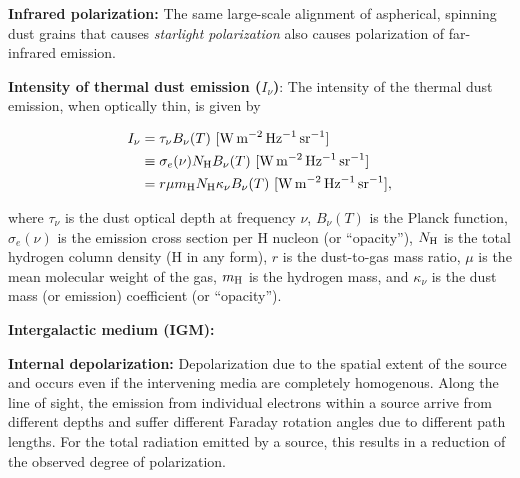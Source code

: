 \documentclass[a4paper,10pt]{article}
\begin{document}
{\noindent}\textbf{Infrared polarization:} The same large-scale alignment of aspherical, spinning dust grains that causes \textit{starlight polarization} also causes polarization of far-infrared emission.

{\noindent}\textbf{Intensity of thermal dust emission ($I_\nu$)}: The intensity of the thermal dust emission, when optically thin, is given by

\begin{align*}
    I_\nu &= \tau_\nu B_\nu(T) ~ [{\rm W\,m^{-2}\,Hz^{-1}\,sr^{-1}}] \\
             &\equiv \sigma_e(\nu)N_{\rm H}B_\nu(T) ~ [{\rm W\,m^{-2}\,Hz^{-1}\,sr^{-1}}] \\
             &= r\mu m_{\rm H}N_{\rm H}\kappa_\nu B_\nu(T) ~ [{\rm W\,m^{-2}\,Hz^{-1}\,sr^{-1}}],
\end{align*}

{\noindent}where $\tau_\nu$ is the dust optical depth at frequency $\nu$, $B_\nu(T)$ is the Planck function, $\sigma_e(\nu)$ is the emission cross section per H nucleon (or ``opacity''), $N_{\rm H}$ is the total hydrogen column density (H in any form), $r$ is the dust-to-gas mass ratio, $\mu$ is the mean molecular weight of the gas, $m_{\rm H}$ is the hydrogen mass, and $\kappa_\nu$ is the dust mass (or emission) coefficient (or ``opacity'').

{\noindent}\textbf{Intergalactic medium (IGM):} 

{\noindent}\textbf{Internal depolarization:} Depolarization due to the spatial extent of the source and occurs even if the intervening media are completely homogenous. Along the line of sight, the emission from individual electrons within a source arrive from different depths and suffer different Faraday rotation angles due to different path lengths. For the total radiation emitted by a source, this results in a reduction of the observed degree of polarization.
\end{document}
